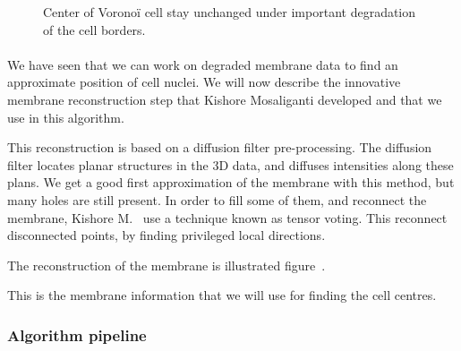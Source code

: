 \begin{figure}[h]
\caption{Center of Voronoï cell stay unchanged under important degradation of the cell borders.}
  \label{fig:incompleteMembraneSynthetic}
\end{figure}

\paragraph*{}
We have seen that we can work on degraded membrane data to find an approximate position of cell nuclei.
We will now describe the innovative membrane reconstruction step that Kishore Mosaliganti developed and that we use in this algorithm.


This reconstruction is based on a diffusion filter pre-processing. The diffusion filter locates planar structures in the 3D data, and diffuses intensities along these plans.
We get a good first approximation of the membrane with this method, but many holes are still present.
In order to fill some of them, and reconnect the membrane, Kishore M.~{\etal} use a technique known as tensor voting.
This reconnect disconnected points, by finding privileged local directions.

The reconstruction of the membrane is illustrated figure~.

This is the membrane information that we will use for finding the cell centres.





\subsubsection{Algorithm pipeline}

